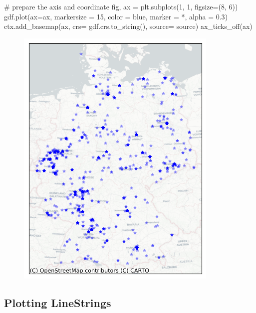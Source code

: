 \documentclass[
  letterpaper,
  DIV=11,
  numbers=noendperiod]{scrreprt}
\newenvironment{Shaded}{\begin{snugshade}}{\end{snugshade}}
\newcommand{\CommentTok}[1]{\textcolor[rgb]{0.37,0.37,0.37}{#1}}
\newcommand{\DecValTok}[1]{\textcolor[rgb]{0.68,0.00,0.00}{#1}}
\newcommand{\FloatTok}[1]{\textcolor[rgb]{0.68,0.00,0.00}{#1}}
\newcommand{\NormalTok}[1]{\textcolor[rgb]{0.00,0.23,0.31}{#1}}
\newcommand{\OperatorTok}[1]{\textcolor[rgb]{0.37,0.37,0.37}{#1}}
\newcommand{\StringTok}[1]{\textcolor[rgb]{0.13,0.47,0.30}{#1}}
\begin{document}
\begin{Shaded}
\begin{Highlighting}[]
\CommentTok{\# prepare the axis and coordinate}
\NormalTok{fig, ax }\OperatorTok{=}\NormalTok{ plt.subplots(}\DecValTok{1}\NormalTok{, }\DecValTok{1}\NormalTok{, figsize}\OperatorTok{=}\NormalTok{(}\DecValTok{8}\NormalTok{, }\DecValTok{6}\NormalTok{))}
\NormalTok{gdf.plot(ax}\OperatorTok{=}\NormalTok{ax, markersize }\OperatorTok{=} \DecValTok{15}\NormalTok{, color }\OperatorTok{=} \StringTok{\textquotesingle{}blue\textquotesingle{}}\NormalTok{, marker }\OperatorTok{=} \StringTok{\textquotesingle{}*\textquotesingle{}}\NormalTok{, alpha }\OperatorTok{=} \FloatTok{0.3}\NormalTok{)}
\NormalTok{ctx.add\_basemap(ax, crs}\OperatorTok{=}\NormalTok{ gdf.crs.to\_string(), source}\OperatorTok{=}\NormalTok{ source)}
\NormalTok{ax\_ticks\_off(ax)}
\end{Highlighting}
\end{Shaded}

\begin{figure}[H]

{\centering \includegraphics{labs/w02_maps_files/figure-pdf/cell-9-output-1.png}

}

\end{figure}

\hypertarget{plotting-linestrings}{%
\subsection{Plotting LineStrings}\label{plotting-linestrings}}
\end{document}
